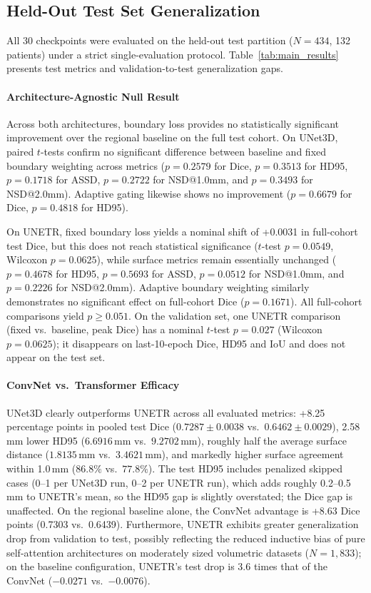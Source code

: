 \documentclass[10pt, a4paper, twocolumn]{article}
\begin{document}
\subsection{Held-Out Test Set Generalization}
All 30 checkpoints were evaluated on the held-out test partition ($N=434$, 132 patients) under a strict single-evaluation protocol. Table~\ref{tab:main_results} presents test metrics and validation-to-test generalization gaps.

\paragraph{Architecture-Agnostic Null Result} Across both architectures, boundary loss provides no statistically significant improvement over the regional baseline on the full test cohort. On UNet3D, paired $t$-tests confirm no significant difference between baseline and fixed boundary weighting across metrics ($p=0.2579$ for Dice, $p=0.3513$ for HD95, $p=0.1718$ for ASSD, $p=0.2722$ for NSD@1.0mm, and $p=0.3493$ for NSD@2.0mm). Adaptive gating likewise shows no improvement ($p=0.6679$ for Dice, $p=0.4818$ for HD95).

On UNETR, fixed boundary loss yields a nominal shift of +0.0031 in full-cohort test Dice, but this does not reach statistical significance ($t$-test $p=0.0549$, Wilcoxon $p=0.0625$), while surface metrics remain essentially unchanged ($p=0.4678$ for HD95, $p=0.5693$ for ASSD, $p=0.0512$ for NSD@1.0mm, and $p=0.2226$ for NSD@2.0mm). Adaptive boundary weighting similarly demonstrates no significant effect on full-cohort Dice ($p=0.1671$). All full-cohort comparisons yield $p \ge 0.051$. On the validation set, one UNETR comparison (fixed vs.\ baseline, peak Dice) has a nominal $t$-test $p=0.027$ (Wilcoxon $p=0.0625$); it disappears on last-10-epoch Dice, HD95 and IoU and does not appear on the test set.

\paragraph{ConvNet vs.\ Transformer Efficacy} UNet3D clearly outperforms UNETR across all evaluated metrics: +8.25 percentage points in pooled test Dice ($0.7287 \pm 0.0038$ vs.\ $0.6462 \pm 0.0029$), 2.58\,mm lower HD95 ($6.6916$\,mm vs.\ $9.2702$\,mm), roughly half the average surface distance ($1.8135$\,mm vs.\ $3.4621$\,mm), and markedly higher surface agreement within 1.0\,mm ($86.8\%$ vs.\ $77.8\%$). The test HD95 includes penalized skipped cases (0--1 per UNet3D run, 0--2 per UNETR run), which adds roughly 0.2--0.5\,mm to UNETR's mean, so the HD95 gap is slightly overstated; the Dice gap is unaffected. On the regional baseline alone, the ConvNet advantage is +8.63 Dice points (0.7303 vs.\ 0.6439). Furthermore, UNETR exhibits greater generalization drop from validation to test, possibly reflecting the reduced inductive bias of pure self-attention architectures on moderately sized volumetric datasets ($N=1,833$); on the baseline configuration, UNETR's test drop is 3.6 times that of the ConvNet ($-0.0271$ vs.\ $-0.0076$).
\end{document}
